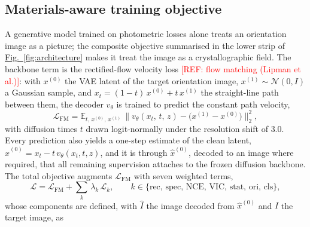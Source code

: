 \documentclass[preprint,12pt]{elsarticle}
\newcommand{\figref}[1]{\hyperref[#1]{Fig.~\ref*{#1}}}
\newcommand{\refneeded}[1]{\textcolor{red}{[REF: #1]}} %
\begin{document}
\subsection{Materials-aware training objective}
\label{sec:generative-loss}

A generative model trained on photometric losses alone treats an orientation image as a picture; the composite objective summarised in the lower strip of \figref{fig:architecture} makes it treat the image as a crystallographic field. The backbone term is the rectified-flow velocity loss \refneeded{flow matching (Lipman et al.)}: with $x^{(0)}$ the VAE latent of the target orientation image, $x^{(1)} \sim \mathcal{N}(0, I)$ a Gaussian sample, and $x_t = (1-t)\,x^{(0)} + t\,x^{(1)}$ the straight-line path between them, the decoder $v_\theta$ is trained to predict the constant path velocity,
\begin{equation}
  \mathcal{L}_{\mathrm{FM}} = \mathbb{E}_{t,\, x^{(0)},\, x^{(1)}}\, \big\| v_\theta(x_t,\, t,\, z) - \big(x^{(1)} - x^{(0)}\big) \big\|_2^2 ,
  \label{eq:fm}
\end{equation}
with diffusion times $t$ drawn logit-normally under the resolution shift of $3.0$. Every prediction also yields a one-step estimate of the clean latent, $\hat{x}^{(0)} = x_t - t\, v_\theta(x_t, t, z)$, and it is through $\hat{x}^{(0)}$, decoded to an image where required, that all remaining supervision attaches to the frozen diffusion backbone. The total objective augments $\mathcal{L}_{\mathrm{FM}}$ with seven weighted terms,
\begin{equation}
  \mathcal{L} = \mathcal{L}_{\mathrm{FM}} + \sum_{k}\, \lambda_k\, \mathcal{L}_k ,
  \qquad
  k \in \{ \mathrm{rec},\, \mathrm{spec},\, \mathrm{NCE},\, \mathrm{VIC},\, \mathrm{stat},\, \mathrm{ori},\, \mathrm{cls} \} ,
  \label{eq:loss}
\end{equation}
whose components are defined, with $\hat{I}$ the image decoded from $\hat{x}^{(0)}$ and $I$ the target image, as
\end{document}
